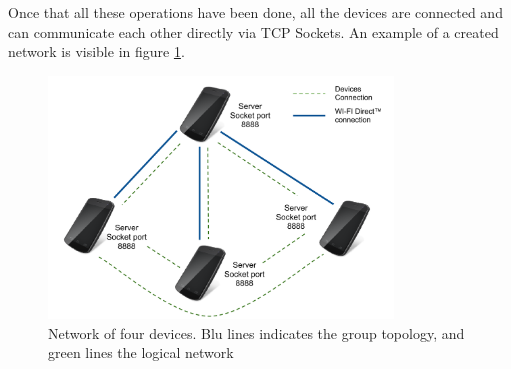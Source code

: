 Once that all these operations have been done, all the devices are connected and can communicate each other directly via TCP Sockets. An example of a created network is visible in figure \ref{fig:device_network}.

\begin{figure}[!htbp]
\centering
\includegraphics[width=3.6in]{imgs/Devices_network.pdf}
\caption{Network of four devices. Blu lines indicates the \direct group topology, and green lines the logical network}
\label{fig:device_network}
\end{figure}
